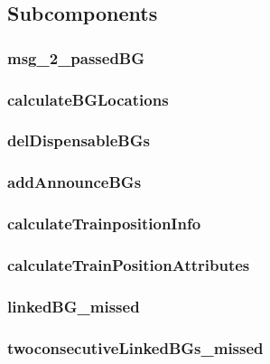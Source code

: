 \subsection{Subcomponents}\label{s:calculateTrainPosition_subcomponents}

\subsubsection{msg\_2\_passedBG}


\subsubsection{calculateBGLocations}


\subsubsection{delDispensableBGs}


\subsubsection{addAnnounceBGs}


\subsubsection{calculateTrainpositionInfo}


\subsubsection{calculateTrainPositionAttributes}


\subsubsection{linkedBG\_missed}


\subsubsection{twoconsecutiveLinkedBGs\_missed}







